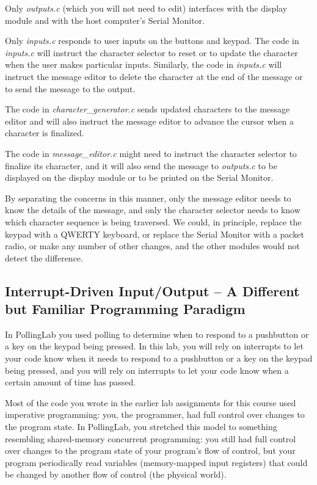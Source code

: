 Only \textit{outputs.c} (which you will not need to edit) interfaces with the display module and with the host computer's Serial Monitor.

Only \textit{inputs.c} responds to user inputs on the buttons and keypad.
The code in \textit{inputs.c} will instruct the character selector to reset or to update the character when the user makes particular inputs.
Similarly, the code in \textit{inputs.c} will instruct the message editor to delete the character at the end of the message or to send the message to the output.

The code in \textit{character\_generator.c} sends updated characters to the message editor and will also instruct the message editor to advance the cursor when a character is finalized.

The code in \textit{message\_editor.c} might need to instruct the character selector to finalize its character,
and it will also send the message to \textit{outputs.c} to be displayed on the display module or to be printed on the Serial Monitor.

By separating the concerns in this manner, only the message editor needs to know the details of the message,
and only the character selector needs to know which character sequence is being traversed.
We could, in principle, replace the keypad with a QWERTY keyboard, or replace the Serial Monitor with a packet radio, or make any number of other changes, and the other modules would not detect the difference.


\subsection{Interrupt-Driven Input/Output -- A Different but Familiar Programming Paradigm}

In PollingLab you used polling to determine when to respond to a pushbutton or a key on the keypad being pressed.
In this lab, you will rely on interrupts to let your code know when it needs to respond to a pushbutton or a key on the keypad being pressed, and you will rely on interrupts to let your code know when a certain amount of time has passed.

\vspace{.25cm}

Most of the code you wrote in the earlier lab assignments for this course used imperative programming:
you, the programmer, had full control over changes to the program state.
In PollingLab, you stretched this model to something resembling shared-memory concurrent programming:
you still had full control over changes to the program state of your program's flow of control,
but your program periodically read variables (memory-mapped input registers) that could be changed by another flow of control (the physical world).

